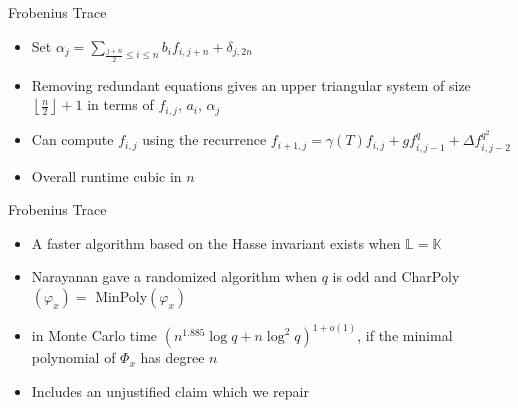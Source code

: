 \documentclass{beamer}
\begin{document}
\begin{frame}{Frobenius Trace}

\begin{itemize}

        \item Set $\alpha_j = \sum_{\frac{j+n}{2} \leq i \leq n} b_i f_{i,j + n} + \delta_{j,2n}$
    \item Removing redundant equations gives an upper triangular system of size $\left\lfloor \frac{n}{2} \right\rfloor + 1$ in terms of $f_{i,j}$, $a_i$, $\alpha_j$
    \item Can compute $f_{i,j}$ using the recurrence $f_{i+1,j} = \gamma(T) f_{i,j} + g f_{i,j-1}^q + \Delta f_{i,j-2}^{q^2}$

\item Overall runtime cubic in $n$

\end{itemize}

    
\end{frame}


\begin{frame}{Frobenius Trace}
\begin{itemize}

\item A faster algorithm based on the Hasse invariant exists when $\mathbb{L} = \mathbb{K}$
\item Narayanan gave a randomized algorithm when $q$ is odd and  CharPoly$(\varphi_x) = $ MinPoly$(\varphi_x)$
\item in Monte Carlo time $(n^{1.885} \log q + n \log^2 q)^{1+o(1)}$,
  if the minimal polynomial of $\Phi_x$ has degree $n$
\item Includes an unjustified claim which we repair
\end{itemize}
\end{frame}
\end{document}
